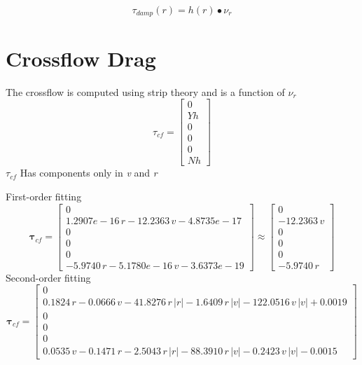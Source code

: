 \documentclass[12pt,a4]{article}
\begin{document}
\begin{equation}
	\tau_{damp}(r) = h(r) \bullet \nu_r
\end{equation}

\section{Crossflow Drag}
The crossflow is computed using strip theory and is a function of $\nu_r$
\begin{equation}
	\tau_{cf} =
	\begin{bmatrix}0\\Yh\\0\\0\\0\\Nh\end{bmatrix}
\end{equation}
$\tau_{cf}$ Has components only in \textit{v} and \textit{r}

First-order fitting
\begin{equation*}
	\bm{\tau}_{cf} = \left[\begin{array}{c} 0\\ 1.2907e-16\,r-12.2363\,v-4.8735e-17\\ 0\\ 0\\ 0\\ -5.9740\,r-5.1780e-16\,v-3.6373e-19 \end{array}\right]
	\approx \left[\begin{array}{c} 0\\ -12.2363\,v\\ 0\\ 0\\ 0\\ -5.9740\,r \end{array}\right]
\end{equation*}
Second-order fitting
\begin{equation*}
	\bm{\tau}_{cf} = \left[\begin{array}{c} 0\\ 0.1824\,r-0.0666\,v-41.8276\,r\,\left|r\right|-1.6409\,r\,\left|v\right|-122.0516\,v\,\left|v\right|+0.0019\\ 0\\ 0\\ 0\\ 0.0535\,v-0.1471\,r-2.5043\,r\,\left|r\right|-88.3910\,r\,\left|v\right|-0.2423\,v\,\left|v\right|-0.0015 \end{array}\right]
\end{equation*}
\end{document}
